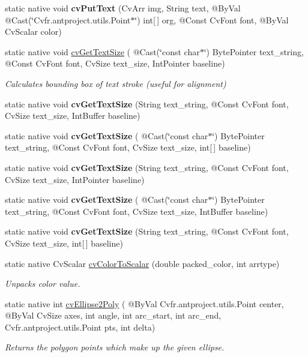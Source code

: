 \begin{DoxyCompactItemize}
static native void {\bfseries cv\+Put\+Text} (Cv\+Arr img, String text, @By\+Val @Cast(\char`\"{}Cv\+fr.antproject.utils.Point$\ast$\char`\"{}) int\mbox{[}$\,$\mbox{]} org, @Const Cv\+Font font, @By\+Val Cv\+Scalar color)
\item 
static native void \hyperlink{group__imgproc__c_gaadcbbe95eaad71798726cedfd442c08f}{cv\+Get\+Text\+Size} ( @Cast(\char`\"{}const char$\ast$\char`\"{}) Byte\+Pointer text\+\_\+string, @Const Cv\+Font font, Cv\+Size text\+\_\+size, Int\+Pointer baseline)
\begin{DoxyCompactList}\small\item\em Calculates bounding box of text stroke (useful for alignment) \end{DoxyCompactList}\item 
static native void {\bfseries cv\+Get\+Text\+Size} (String text\+\_\+string, @Const Cv\+Font font, Cv\+Size text\+\_\+size, Int\+Buffer baseline)
\item 
static native void {\bfseries cv\+Get\+Text\+Size} ( @Cast(\char`\"{}const char$\ast$\char`\"{}) Byte\+Pointer text\+\_\+string, @Const Cv\+Font font, Cv\+Size text\+\_\+size, int\mbox{[}$\,$\mbox{]} baseline)
\item 
static native void {\bfseries cv\+Get\+Text\+Size} (String text\+\_\+string, @Const Cv\+Font font, Cv\+Size text\+\_\+size, Int\+Pointer baseline)
\item 
static native void {\bfseries cv\+Get\+Text\+Size} ( @Cast(\char`\"{}const char$\ast$\char`\"{}) Byte\+Pointer text\+\_\+string, @Const Cv\+Font font, Cv\+Size text\+\_\+size, Int\+Buffer baseline)
\item 
static native void {\bfseries cv\+Get\+Text\+Size} (String text\+\_\+string, @Const Cv\+Font font, Cv\+Size text\+\_\+size, int\mbox{[}$\,$\mbox{]} baseline)
\item 
static native Cv\+Scalar \hyperlink{group__imgproc__c_ga740bdb87be7fa22bb0fda2e620a13777}{cv\+Color\+To\+Scalar} (double packed\+\_\+color, int arrtype)
\begin{DoxyCompactList}\small\item\em Unpacks color value. \end{DoxyCompactList}\item 
static native int \hyperlink{group__imgproc__c_ga4636892155a3d693c0906197d7777d0c}{cv\+Ellipse2\+Poly} ( @By\+Val Cv\+fr.antproject.utils.Point center, @By\+Val Cv\+Size axes, int angle, int arc\+\_\+start, int arc\+\_\+end, Cv\+fr.antproject.utils.Point pts, int delta)
\begin{DoxyCompactList}\small\item\em Returns the polygon points which make up the given ellipse. \end{DoxyCompactList}\item 

\end{DoxyCompactItemize}
